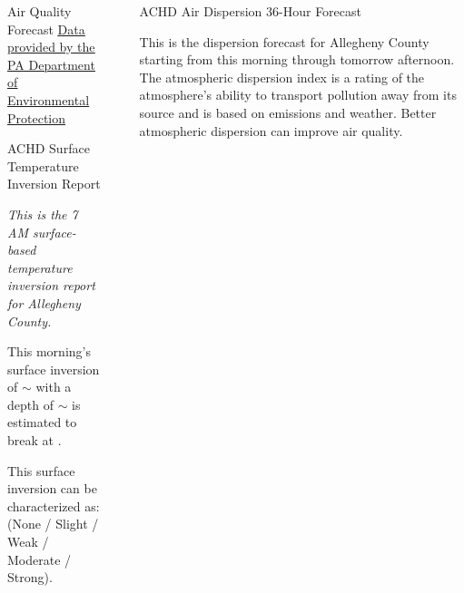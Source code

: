 \documentclass[final, xcolor=table]{beamer}
\newlength{\sepwidth}
\newlength{\colwidth}
\newcommand{\separatorcolumn}{\begin{column}{\sepwidth}\end{column}}
\begin{document}
\begin{frame}[t]
\begin{columns}[t]
\begin{column}{\colwidth}
\begin{block}{Air Quality Forecast}
    \href{https://www.ahs.dep.pa.gov/AQPartnersWeb/forecast_home.aspx}{\underline{Data provided by the PA Department of Environmental Protection}}

  \end{block} 
  

  \begin{block}{ACHD Surface Temperature Inversion Report}

    \textit{This is the 7 AM surface-based temperature inversion report for Allegheny County.}

    This morning’s surface inversion of \underline{\textbf{$\sim$\Temp}} with a depth of \underline{\textbf{$\sim$\Depth}} is estimated to break at \underline{\textbf{\Time}}. 
    
    This surface inversion can be characterized as: \underline{\textbf{\Scale}} (None / Slight / Weak / Moderate / Strong). 
    
    \Inversion

  \end{block}

\end{column} 

\separatorcolumn



\begin{column}{\colwidth}


  \begin{block}{ACHD Air Dispersion 36-Hour Forecast}

    This is the dispersion forecast for Allegheny County starting from this morning through tomorrow afternoon. The atmospheric dispersion index is a rating of the atmosphere’s ability to transport pollution away from its source and is based on emissions and weather. Better atmospheric dispersion can improve air quality.


\end{block}
\end{column}
\end{columns}
\end{frame}
\end{document}
